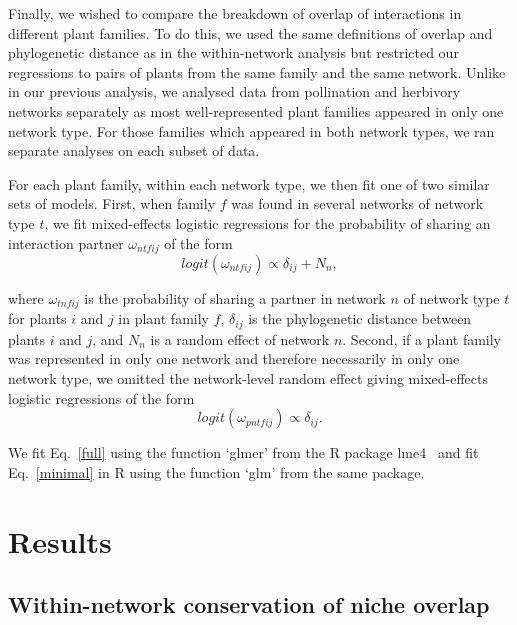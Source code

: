 \documentclass[12pt]{article}
\begin{document}
\begin{spacing}{1.5}
  Finally, we wished to compare the breakdown of overlap of interactions in
  different plant families. To do this, we used the same definitions of overlap
  and phylogenetic distance as in the within-network analysis but restricted
  our regressions to pairs of plants from the same family and the same network.
  Unlike in our previous analysis, we analysed data from pollination and
  herbivory networks separately as most well-represented plant families appeared
  in only one network type. For those families which appeared in both network types, 
  we ran separate analyses on each subset of data.


  For each plant family, within each network type, we then fit one of two similar 
  sets of models. First, when family $f$ was found in several networks of network
  type $t$, we fit mixed-effects logistic regressions for the probability of sharing an interaction partner $\omega_{ntfij}$ of the form
  \begin{equation}
    logit(\omega_{ntfij}) \propto \delta_{ij} + N_{n} ,
    \label{full}
  \end{equation}

  \noindent where $\omega_{tnfij}$ is the probability of sharing a partner 
  in network $n$ of network type $t$ for plants $i$ and $j$ in plant family $f$,
  $\delta_{ij}$ is the phylogenetic distance between plants $i$ and $j$, and
  $N_{n}$ is a random effect of network $n$.
  Second, if a plant family was represented in only one network 
  and therefore necessarily in only one network type, we omitted the 
  network-level random effect giving mixed-effects logistic regressions of the form
 \begin{equation}
    logit(\omega_{pntfij}) \propto \delta_{ij} .
    \label{minimal}
  \end{equation}

  \noindent We fit Eq.~\ref{full} using the function `glmer' from the
  R package lme4~\citep{lme4} and fit Eq.~\ref{minimal} in R using the
  function `glm' from the same package.


\section*{Results}


  \subsection*{Within-network conservation of niche overlap}


\end{spacing}
\end{document}
